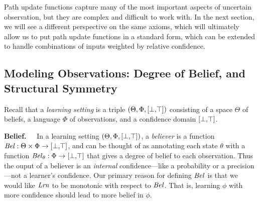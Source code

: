 {	Path update functions capture many of the most important aspects of 
	uncertain observation, but they are complex and difficult to work with.
	In the next section, we will
	see a different perspective on the same axioms,
	which will ultimately allow us to 
	put path update functions in a standard form, 
	which can be extended to handle combinations of inputs weighted
	by relative confidence.
}%



\subsection{Modeling Observations: 
	Degree of Belief, and Structural Symmetry}
	\label{ssec:full-learn}
Recall that a \emph{learning setting} is a triple $(\Theta, \Phi, [\bot,\!\top])$
consisting of
    a space $\Theta$ of beliefs,
    a language $\Phi$ of observations,
    and a confidence domain $[\bot,\!\top]$.

\textbf{Belief.~~}
In a learning setting $(\Theta, \Phi, [\bot,\!\top])$,
a \emph{believer} is a function $\mathit{Bel} : \Theta \times \Phi \to [\bot,\!\top]$,
and can be thought of as annotating each state $\theta$ with a function $\mathit{Bel}_\theta : \Phi \to [\bot,\!\top]$ that gives a degree of belief to each observation. 
Thus the ouput of a believer is an \emph{internal} confidence---like a probability or a precision---not a learner's confidence.
Our primary reason for defining $\mathit{Bel}$ is that 
	we would like $\mathit{Lrn}$ to be monotonic with respect to $\mathit{Bel}$.
    That is, learning $\phi$ with more confidence
    should lead to more belief in $\phi$.

